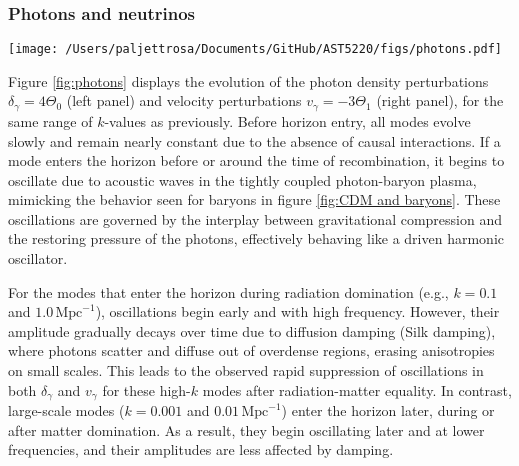 \documentclass{aa}
\numberwithin{equation}{section}
\numberwithin{table}{section}
\numberwithin{figure}{section}
\begin{document}
\subsubsection{Photons and neutrinos}\label{subsubsec: III results photons and neutrinos}

\begin{figure*}
  \centering
  \texttt{[image: /Users/paljettrosa/Documents/GitHub/AST5220/figs/photons.pdf]}
  \caption{Evolution of photon density $\delta_\gamma=4\Theta_0$ (left) and velocity $v_\gamma=-3\Theta_1$ (right) perturbations. 
  The photon perturbations grow and oscillate after horizon entry, with oscillations damping over time, especially for small-scale modes after matter-radiation equality.}\label{fig:photons}
\end{figure*}

Figure \ref{fig:photons} displays the evolution of the photon density perturbations $\delta_\gamma = 4\Theta_0$ (left panel) and velocity perturbations $v_\gamma = -3\Theta_1$ (right panel), for the same range of $k$-values as previously. Before horizon entry, all modes evolve slowly and remain nearly constant due to the absence of causal interactions. If a mode enters the horizon before or around the time of recombination, it begins to oscillate due to acoustic waves in the tightly coupled photon-baryon plasma, mimicking the behavior seen for baryons in figure \ref{fig:CDM and baryons}. These oscillations are governed by the interplay between gravitational compression and the restoring pressure of the photons, effectively behaving like a driven harmonic oscillator.

For the modes that enter the horizon during radiation domination (e.g., $k=0.1$ and $1.0\,\text{Mpc}^{-1}$), oscillations begin early and with high frequency. However, their amplitude gradually decays over time due to diffusion damping (Silk damping), where photons scatter and diffuse out of overdense regions, erasing anisotropies on small scales. This leads to the observed rapid suppression of oscillations in both $\delta_\gamma$ and $v_\gamma$ for these high-$k$ modes after radiation-matter equality. In contrast, large-scale modes ($k=0.001$ and $0.01\,\text{Mpc}^{-1}$) enter the horizon later, during or after matter domination. As a result, they begin oscillating later and at lower frequencies, and their amplitudes are less affected by damping. 
\end{document}
